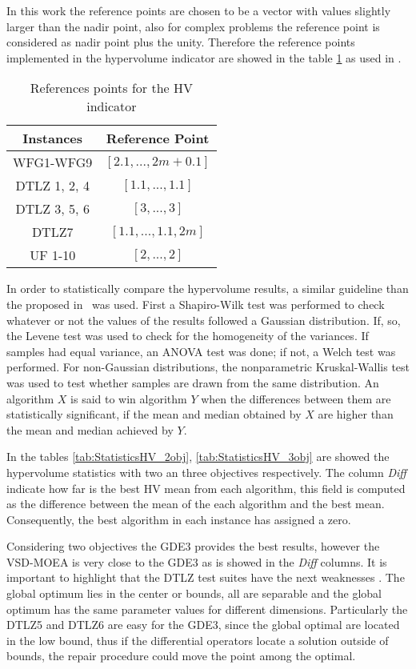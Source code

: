 In this work the reference points are chosen to be a vector with values slightly larger than the nadir point, also for complex problems the reference point is considered as nadir point plus the unity.
%
Therefore the reference points implemented in the hypervolume indicator are showed in the table \ref{tab:ReferencePoints} as used in \cite{Joel:Kuhn_Munkres, Joel:OperatorAHX}.

\begin{table}[t]
\centering
\caption{References points for the HV indicator}
\label{tab:ReferencePoints}
\begin{tabular}{cc}
\hline
\textbf{Instances} & \textbf{Reference Point} \\ \hline
WFG1-WFG9 & $[2.1, ...,2m+0.1]$ \\
DTLZ 1, 2, 4 & $[1.1, ..., 1.1]$ \\
DTLZ 3, 5, 6 & $[3, ..., 3]$ \\
DTLZ7 & $[1.1, ..., 1.1, 2m]$ \\
UF 1-10 & $[2, ..., 2]$ \\ \hline
\end{tabular}
\end{table}
%
In order to statistically compare the hypervolume results, a similar guideline than the proposed in~\cite{Joel:StatisticalTest} was used. 
%
First a Shapiro-Wilk test was performed to check whatever or not the values of the results followed a Gaussian distribution. 
%
If, so, the Levene test was used to check for the homogeneity of the variances. 
%
If samples had equal variance, an ANOVA test was done; if not, a Welch test was performed. 
%
For non-Gaussian distributions, the nonparametric Kruskal-Wallis test was used to test whether samples are drawn from the same distribution. 
%
An algorithm $X$ is said to win algorithm $Y$ when the differences between them are statistically significant, if the mean and median obtained by $X$ are higher than the mean and median achieved by $Y$.

%

In the tables \ref{tab:StatisticsHV_2obj}, \ref{tab:StatisticsHV_3obj} are showed the hypervolume statistics with two an three objectives respectively.
%
The column \textit{Diff} indicate how far is the best HV mean from each algorithm, this field is computed as the difference between the mean of the each algorithm and the best mean.
%
Consequently, the best algorithm in each instance has assigned a zero.
%

Considering two objectives the GDE3 provides the best results, however the VSD-MOEA is very close to the GDE3 as is showed in the \textit{Diff} columns.
%
It is important to highlight that the DTLZ test suites have the next weaknesses \cite{Joel:CEC2009}.
The global optimum lies in the center or bounds, all are separable and the global optimum has the same parameter values for different dimensions.
%
Particularly the DTLZ5 and DTLZ6 are easy for the GDE3, since the global optimal are located in the low bound, thus if the differential operators locate a solution outside of bounds, the repair procedure could move the point among the optimal.


